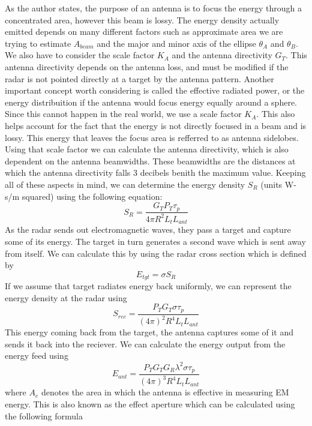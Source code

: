 \documentclass[12pt]{article}
\begin{document}
As the author states, the purpose of an antenna is to focus the energy through a concentrated area, however this beam is lossy. The energy density actually emitted depends on many different factors such as approximate area we are trying to estimate $A_{beam}$ and the major and minor axis of the ellipse $\theta_A$ and $\theta_B$. We also have to consider the scale factor $K_A$ and  the antenna directivity $G_T$. This antenna directivity depends on the antenna loss, and must be modified if the radar is not pointed directly at a target by the antenna pattern. 
Another important concept worth considering is called the effective radiated power, or the energy distribuition if the antenna would focus energy equally around a sphere. Since this cannot happen in the real world, we use a scale factor $K_A$. This also helps account for the fact that the energy is not directly focused in a beam and is lossy. This energy that leaves the focus area is refferred to as antenna sidelobes. Using that scale factor we can calculate the antenna directivity, which is also dependent on the antenna beamwidths. These beamwidths are the distances at which the antenna directivity falls 3 decibels benith the maximum value. Keeping all of these aspects in mind, we can determine the energy density $S_R$ (units W-s/m squared) using the following equation:
\begin{equation}
    S_R = \frac{G_T P_T \tau_p}{4 \pi R^2 L_t L_{ant}}
\end{equation}
As the radar sends out electromagnetic waves, they pass a target and capture some of its energy. The target in turn generates a second wave which is sent away from itself. We can calculate this by using the radar cross section which is defined by
\begin{equation}
    E_{tgt} = \sigma S_R 
\end{equation}
If we assume that target radiates energy back uniformly, we can represent the energy density at the radar using 
\begin{equation}
    S_{rec} = \frac{P_T G_T \sigma \tau_p}{(4 \pi)^2 R^4 L_t L_{ant}}
\end{equation}
This energy coming back from the target, the antenna captures some of it and sends it back into the reciever. We can calculate the energy output from the energy feed using
\begin{equation}
    E_{ant} = \frac{P_T G_T G_R \lambda^2 \sigma \tau_p}{(4 \pi)^3 R^4 L_t L_{ant}}
\end{equation}
where $A_e$ denotes the area in which the antenna is effective in measuring EM energy. This is also known as the effect aperture which can be calculated using the following formula
\end{document}
